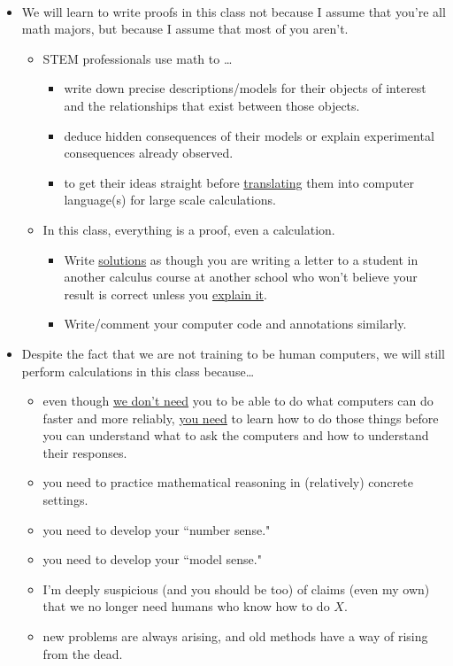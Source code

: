 \newpage

\begin{remark}\,
\begin{itemize}
\item We will learn to write proofs in this class not because I assume that you're all math majors, but because I assume that most of you aren't.
\begin{itemize}
\item STEM professionals use math to \dots
\begin{itemize}
\item write down precise descriptions/models for their objects of interest and the relationships that exist between those objects.
\item deduce hidden consequences of their models or explain experimental consequences already observed.
\item to get  their ideas straight before \underline{translating} them into computer language(s) for large scale calculations.
\end{itemize}
\item In this class, everything is a proof, even a calculation.
\begin{itemize}
\item Write \underline{solutions} as though you are writing a letter to a student in another calculus course at another school who won't believe your result is correct unless you \underline{explain it}.
\item Write/comment your computer code and annotations similarly.
\end{itemize}
\end{itemize}
\vfill

\item Despite the fact that we are not training to be human computers, we will still perform calculations in this class because\dots
\begin{itemize}
\item even though \underline{we don't need} you to be able to do what computers can do faster and more reliably, \underline{you need} to learn how to do those things before you can understand what to ask the computers and how to understand their responses.
\item you need to practice mathematical reasoning in (relatively) concrete settings.
\item you need to develop your ``number sense."
\item you need to develop your ``model sense."
\item I'm deeply suspicious (and you should be too) of claims (even my own) that we no longer need humans who know how to do $X$.
\item new problems are always arising, and old methods have a way of rising from the dead. 
\end{itemize}
\vfill
\end{itemize}
\end{remark}


